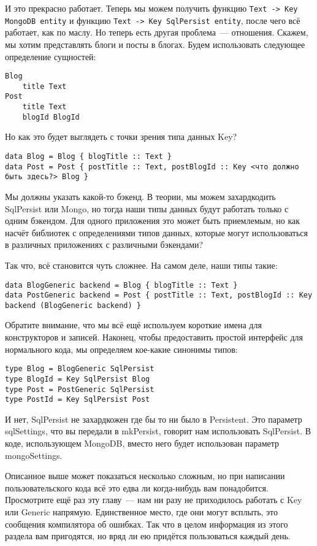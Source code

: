 И это прекрасно работает. Теперь мы можем получить функцию \lstinline'Text -> Key MongoDB entity' и функцию \lstinline'Text -> Key SqlPersist entity', после чего всё работает, как по маслу. Но теперь есть другая проблема~--- отношения. Скажем, мы хотим представлять блоги и посты в блогах. Будем использовать следующее определение сущностей:

\begin{lstlisting}
Blog
    title Text
Post
    title Text
    blogId BlogId
\end{lstlisting}

Но как это будет выглядеть с точки зрения типа данных Key?

\begin{lstlisting}
data Blog = Blog { blogTitle :: Text }
data Post = Post { postTitle :: Text, postBlogId :: Key <что должно быть здесь?> Blog }
\end{lstlisting}

Мы должны указать какой-то бэкенд. В теории, мы можем захардкодить SqlPersist или Mongo, но тогда наши типы данных будут работать только с одним бэкендом. Для одного приложения это может быть приемлемым, но как насчёт библиотек с определениями типов данных, которые могут использоваться в различных приложениях с различными бэкендами?

Так что, всё становится чуть сложнее. На самом деле, наши типы такие:

\begin{lstlisting}
data BlogGeneric backend = Blog { blogTitle :: Text }
data PostGeneric backend = Post { postTitle :: Text, postBlogId :: Key backend (BlogGeneric backend) }
\end{lstlisting}

Обратите внимание, что мы всё ещё используем короткие имена для конструкторов и записей. Наконец, чтобы предоставить простой интерфейс для нормального кода, мы определяем кое-какие синонимы типов:

\begin{lstlisting}
type Blog = BlogGeneric SqlPersist
type BlogId = Key SqlPersist Blog
type Post = PostGeneric SqlPersist
type PostId = Key SqlPersist Post
\end{lstlisting}

И нет, SqlPersist не захардкожен где бы то ни было в Persistent. Это параметр sqlSettings, что вы передали в mkPersist, говорит нам использовать SqlPersist. В коде, использующем MongoDB, вместо него будет использован параметр mongoSettings.

Описанное выше может показаться несколько сложным, но при написании пользовательского кода всё это едва ли когда-нибудь вам понадобится. Просмотрите ещё раз эту главу~--- нам ни разу не приходилось работать с Key или Generic напрямую. Единственное место, где они могут всплыть, это сообщения компилятора об ошибках. Так что в целом информация из этого раздела вам пригодятся, но вряд ли ею придётся пользоваться каждый день.

